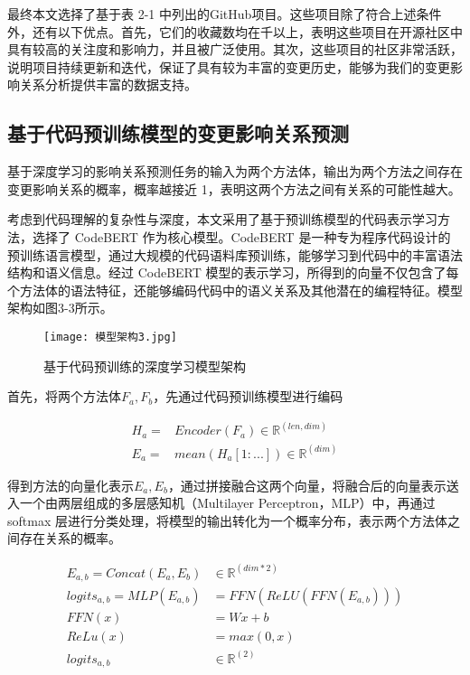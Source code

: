 最终本文选择了基于表 2-1 中列出的GitHub项目。这些项目除了符合上述条件外，还有以下优点。首先，它们的收藏数均在千以上，表明这些项目在开源社区中具有较高的关注度和影响力，并且被广泛使用。其次，这些项目的社区非常活跃，说明项目持续更新和迭代，保证了具有较为丰富的变更历史，能够为我们的变更影响关系分析提供丰富的数据支持。

\subsection{基于代码预训练模型的变更影响关系预测}

基于深度学习的影响关系预测任务的输入为两个方法体，输出为两个方法之间存在变更影响关系的概率，概率越接近 1，表明这两个方法之间有关系的可能性越大。

考虑到代码理解的复杂性与深度，本文采用了基于预训练模型的代码表示学习方法，选择了 CodeBERT 作为核心模型。CodeBERT 是一种专为程序代码设计的预训练语言模型，通过大规模的代码语料库预训练，能够学习到代码中的丰富语法结构和语义信息。经过 CodeBERT 模型的表示学习，所得到的向量不仅包含了每个方法体的语法特征，还能够编码代码中的语义关系及其他潜在的编程特征。模型架构如图3-3所示。

\clearpage

\begin{figure}[h]
\centering
\texttt{[image: 模型架构3.jpg]}
\caption{基于代码预训练的深度学习模型架构}
\end{figure}


首先，将两个方法体$ F_a, F_b$，先通过代码预训练模型进行编码

\begin{align}
H_a=&Encoder(F_a) \in \mathbb{R}^{(len,dim)} \\
E_a=&mean(H_a[1:...]) \in \mathbb{R}^{(dim)}
\end{align}

得到方法的向量化表示$ E_a, E_b$，通过拼接融合这两个向量，将融合后的向量表示送入一个由两层组成的多层感知机（Multilayer Perceptron，MLP）中，再通过 softmax 层进行分类处理，将模型的输出转化为一个概率分布，表示两个方法体之间存在关系的概率。

\begin{align}
E_{a,b}=Concat(E_a,E_b)& \in \mathbb{R}^{(dim*2)} \\
logits_{a,b}=MLP(E_{a,b})&=FFN(ReLU(FFN(E_{a,b}))) \\
FFN(x)&=Wx+b\\
ReLu(x)&=max(0,x)\\
logits_{a,b}& \in \mathbb{R}^{(2)}
\end{align}

